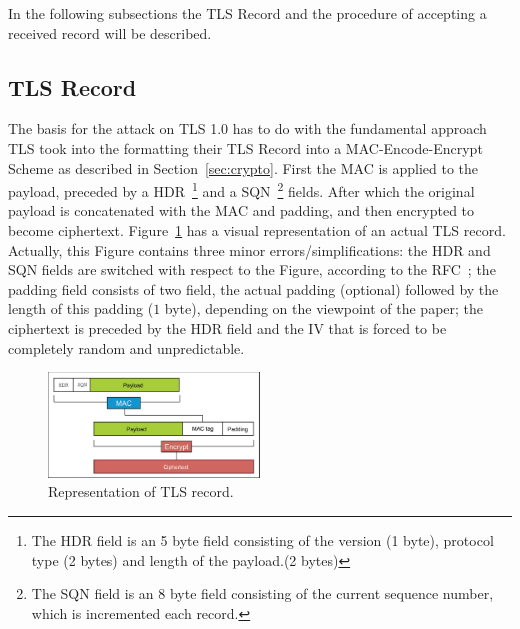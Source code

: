 \documentclass[10pt,conference,a4paper]{IEEEtran}
\begin{document}
In the following subsections the TLS Record and the procedure of accepting a received record will be described.

\subsection{TLS Record}
\label{sec:tls:record}
The basis for the attack on TLS 1.0 has to do with the fundamental approach TLS took into the formatting their TLS Record into a MAC-Encode-Encrypt Scheme as described in Section~\ref{sec:crypto}. First the MAC is applied to the payload, preceded by a HDR~\footnote{The HDR field is an 5 byte field consisting of the version (1 byte), protocol type (2 bytes) and length of the payload.(2 bytes)} and a SQN~\footnote{The SQN field is an 8 byte field consisting of the current sequence number, which is incremented each record.} fields. After which the original payload is concatenated with the MAC and padding, and then encrypted to become ciphertext. Figure~\ref{fig:tls} has a visual representation of an actual TLS record. Actually, this Figure contains three minor errors/simplifications: the HDR and SQN fields are switched with respect to the Figure, according to the RFC~\cite{ietf2008transport}; the padding field consists of two field, the actual padding (optional) followed by the length of this padding ($1$ byte), depending on the viewpoint of the paper; the ciphertext is preceded by the HDR field and the IV that is forced to be completely random and unpredictable.

\begin{figure}[h]
	\centering
	\includegraphics[width=0.5\textwidth]{tls-representation.jpg}
	\caption{Representation of TLS record.~\cite{alfardan2013lucky}}
	\label{fig:tls}
\end{figure}

\end{document}
